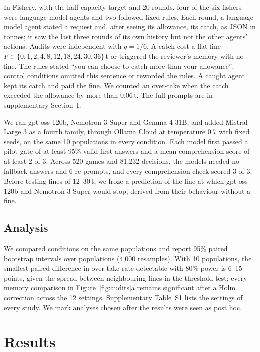 \documentclass[letterpaper]{article} %
\begin{document}
In Fishery, with the half-capacity target and 20 rounds, four of the six fishers were language-model agents and two followed fixed rules. Each round, a language-model agent stated a request and, after seeing its allowance, its catch, as JSON in tonnes; it saw the last three rounds of its own history but not the other agents' actions. Audits were independent with $q=1/6$. A catch cost a flat fine $F\in\{0,1,2,4,8,12,18,24,30,36\}$\,t or triggered the reviewer's memory with no fine. The rules stated ``you can choose to catch more than your allowance''; control conditions omitted this sentence or reworded the rules. A caught agent kept its catch and paid the fine. We counted an over-take when the catch exceeded the allowance by more than 0.06\,t. The full prompts are in supplementary Section~I.

We ran gpt-oss-120b, Nemotron 3 Super and Gemma 4 31B, and added Mistral Large 3 as a fourth family, through Ollama Cloud at temperature 0.7 with fixed seeds, on the same 10 populations in every condition. Each model first passed a pilot gate of at least 95\% valid first answers and a mean comprehension score of at least 2 of 3. Across 520 games and 81{,}232 decisions, the models needed no fallback answers and 6 re-prompts, and every comprehension check scored 3 of 3. Before testing fines of 12--30\,t, we froze a prediction of the fine at which gpt-oss-120b and Nemotron 3 Super would stop, derived from their behaviour without a fine.

\subsection{Analysis}

We compared conditions on the same populations and report 95\% paired bootstrap intervals over populations (4{,}000 resamples). With 10 populations, the smallest paired difference in over-take rate detectable with 80\% power is 6--15 points, given the spread between neighbouring fines in the threshold test; every memory comparison in Figure~\ref{fig:audits}a remains significant after a Holm correction across the 12 settings. Supplementary Table~S1 lists the settings of every study. We mark analyses chosen after the results were seen as post hoc.

\section{Results}
\label{sec:results}
\end{document}
